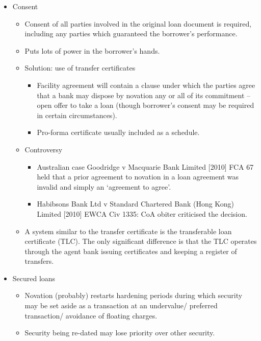 \documentclass[
]{article}
\providecommand{\tightlist}{%
  \setlength{\itemsep}{0pt}\setlength{\parskip}{0pt}}
\begin{document}
\begin{itemize}
\tightlist
\item
  Consent

  \begin{itemize}
  \tightlist
  \item
    Consent of all parties involved in the original loan document is
    required, including any parties which guaranteed the borrower's
    performance.
  \item
    Puts lots of power in the borrower's hands.
  \item
    Solution: use of transfer certificates

    \begin{itemize}
    \tightlist
    \item
      Facility agreement will contain a clause under which the parties
      agree that a bank may dispose by novation any or all of its
      commitment -- open offer to take a loan (though borrower's consent
      may be required in certain circumstances).
    \item
      Pro-forma certificate usually included as a schedule.
    \end{itemize}
  \item
    Controversy

    \begin{itemize}
    \tightlist
    \item
      Australian case Goodridge v Macquarie Bank Limited {[}2010{]} FCA
      67 held that a prior agreement to novation in a loan agreement was
      invalid and simply an `agreement to agree'.
    \item
      Habibsons Bank Ltd v Standard Chartered Bank (Hong Kong) Limited
      {[}2010{]} EWCA Civ 1335: CoA obiter criticised the decision.
    \end{itemize}
  \item
    A system similar to the transfer certificate is the transferable
    loan certificate (TLC). The only significant difference is that the
    TLC operates through the agent bank issuing certificates and keeping
    a register of transfers.
  \end{itemize}
\item
  Secured loans

  \begin{itemize}
  \tightlist
  \item
    Novation (probably) restarts hardening periods during which security
    may be set aside as a transaction at an undervalue/ preferred
    transaction/ avoidance of floating charges.
  \item
    Security being re-dated may lose priority over other security.


\end{itemize}
\end{itemize}
\end{document}
